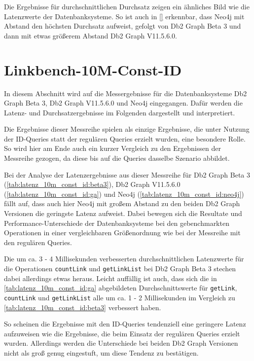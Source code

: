 Die Ergebnisse für durchschnittlichen Durchsatz zeigen ein ähnliches Bild wie die Latenzwerte der Datenbanksysteme. So ist auch in \autoref{} erkennbar, dass Neo4j mit Abstand den höchsten Durchsatz aufweist, gefolgt von Db2 Graph Beta 3 und dann mit etwas größerem Abstand Db2 Graph V11.5.6.0.


\section{Linkbench-10M-Const-ID}
\label{ergebnisse:10m_const_id}
In diesem Abschnitt wird auf die Messergebnisse für die Datenbanksysteme Db2 Graph Beta 3, Db2 Graph V11.5.6.0 und Neo4j eingegangen. Dafür werden die Latenz- und Durchsatzergebnisse im Folgenden dargestellt und interpretiert. 

Die Ergebnisse dieser Messreihe spielen als einzige Ergebnisse, die unter Nutzung der ID-Queries statt der regulären Queries erzielt wurden, eine besondere Rolle. So wird hier am Ende auch ein kurzer Vergleich zu den Ergebnissen der Messreihe  gezogen, da diese bis auf die Queries dasselbe Szenario abbildet.

Bei der Analyse der Latenzergebnisse aus dieser Messreihe für Db2 Graph Beta 3 (\autoref{tab:latenz_10m_const_id:beta3}), Db2 Graph V11.5.6.0 (\autoref{tab:latenz_10m_const_id:ga}) und Neo4j (\autoref{tab:latenz_10m_const_id:neo4j}) fällt auf, dass auch hier Neo4j mit großem Abstand zu den beiden Db2 Graph Versionen die geringste Latenz aufweist. Dabei bewegen sich die Resultate und Performance-Unterschiede der Datenbanksysteme bei den gebenchmarkten Operationen in einer vergleichbaren Größenordnung wie bei der Messreihe  mit den regulären Queries. 

Die um ca. 3 - 4 Millisekunden verbesserten durchschnittlichen Latenzwerte für die Operationen \texttt{countLink} und \texttt{getLinkList} bei Db2 Graph Beta 3 stechen dabei allerdings etwas heraus. Leicht auffällig ist auch, dass sich die in \autoref{tab:latenz_10m_const_id:ga} abgebildeten Durchschnittswerte für \texttt{getLink}, \texttt{countLink} und \texttt{getLinkList} alle um ca. 1 - 2 Millisekunden im Vergleich zu \autoref{tab:latenz_10m_const_id:beta3} verbessert haben. 

So scheinen die Ergebnisse mit den ID-Queries tendenziell eine geringere Latenz aufzuweisen wie die Ergebnisse, die beim Einsatz der regulären Queries erzielt wurden. Allerdings werden die Unterschiede bei beiden Db2 Graph Versionen nicht als groß genug eingestuft, um diese Tendenz zu bestätigen. 

